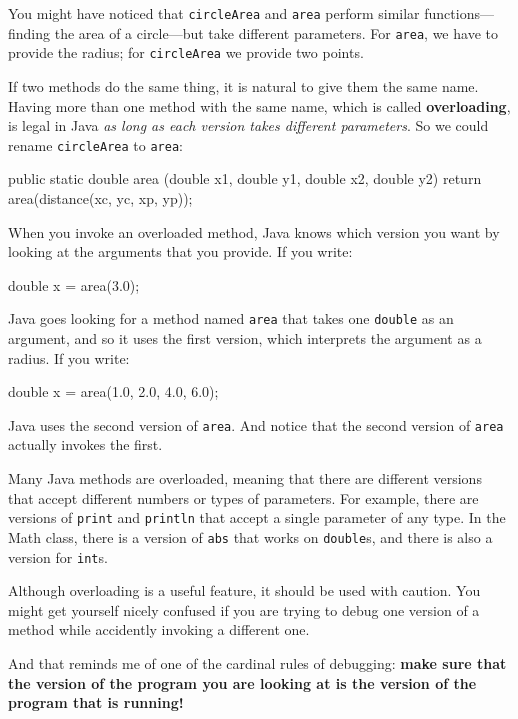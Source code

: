 \documentclass[12pt]{book}
\begin{document}
You might have noticed that {\tt circleArea} and {\tt area} perform similar functions---finding the area of a circle---but take different parameters.
For {\tt area}, we have to provide the radius; for {\tt circleArea} we provide two points.

If two methods do the same thing, it is natural to give them the same name.
Having more than one method with the same name, which is called {\bf overloading}, is legal in Java {\em as long as each version takes different parameters}.
So we could rename {\tt circleArea} to {\tt area}:

\begin{code}
    public static double area
            (double x1, double y1, double x2, double y2) {
        return area(distance(xc, yc, xp, yp));
    }
\end{code}

When you invoke an overloaded method, Java knows which version you want by looking at the arguments that you provide.
If you write:

\begin{code}
    double x = area(3.0);
\end{code}

Java goes looking for a method named {\tt area} that takes one {\tt double} as an argument, and so it uses the first version, which interprets the argument as a radius.
If you write:

\begin{code}
    double x = area(1.0, 2.0, 4.0, 6.0);
\end{code}

Java uses the second version of {\tt area}.
And notice that the second version of {\tt area} actually invokes the first.

Many Java methods are overloaded, meaning that there are different versions that accept different numbers or types of parameters.
For example, there are versions of {\tt print} and {\tt println} that accept a single parameter of any type.
In the Math class, there is a version of {\tt abs} that works on {\tt double}s, and there is also a version for {\tt int}s.

Although overloading is a useful feature, it should be used with caution.
You might get yourself nicely confused if you are trying to debug one version of a method while accidently invoking a different one.

And that reminds me of one of the cardinal rules of debugging: {\bf make sure that the version of the program you are looking at is the version of the program that is running!}
\end{document}
